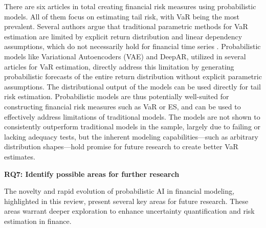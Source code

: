There are six articles in total creating financial risk measures using probabilistic models. All of them focus on estimating tail risk, with VaR being the most prevalent. Several authors argue that traditional parametric methods for VaR estimation are limited by explicit return distribution and linear dependency assumptions, which do not necessarily hold for financial time series \parencite{arian2022encoded,Fatouros2023DeepVaR}. Probabilistic models like Variational Autoencoders (VAE) and DeepAR, utilized in several articles for VaR estimation, directly address this limitation by generating probabilistic forecasts of the entire return distribution without explicit parametric assumptions. The distributional output of the models can be used directly for tail risk estimation. Probabilistic models are thus potentially well-suited for constructing financial risk measures such as VaR or ES, and can be used to effectively address limitations of traditional models. The models are not shown to consistently outperform traditional models in the sample, largely due to failing or lacking adequacy tests, but the inherent modeling capabilities—such as arbitrary distribution shapes—hold promise for future research to create better VaR estimates.

\textbf{RQ7: Identify possible areas for further research}\nopagebreak

The novelty and rapid evolution of probabilistic AI in financial modeling, highlighted in this review, present several key areas for future research. These areas warrant deeper exploration to enhance uncertainty quantification and risk estimation in finance.

